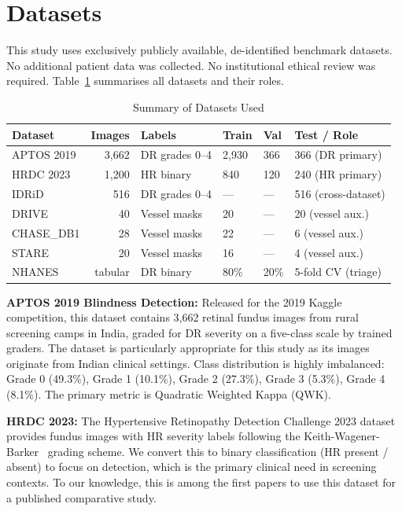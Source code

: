 \documentclass[review,12pt]{elsarticle}
\begin{document}
\section{Datasets}
\label{sec:datasets}

This study uses exclusively publicly available, de-identified benchmark
datasets. No additional patient data was collected. No institutional ethical
review was required. Table~\ref{tab:datasets} summarises all datasets and
their roles.

\begin{table}[htbp]
\caption{Summary of Datasets Used}
\label{tab:datasets}
\centering
\begin{tabular}{lrllll}
\toprule
\textbf{Dataset} & \textbf{Images} & \textbf{Labels} & \textbf{Train}
& \textbf{Val} & \textbf{Test / Role} \\
\midrule
APTOS 2019     & 3,662  & DR grades 0--4 & 2,930 & 366  & 366 (DR primary) \\
HRDC 2023      & 1,200  & HR binary      & 840   & 120  & 240 (HR primary) \\
IDRiD          & 516    & DR grades 0--4 & ---   & ---  & 516 (cross-dataset) \\
DRIVE          & 40     & Vessel masks   & 20    & ---  & 20  (vessel aux.) \\
CHASE\_DB1     & 28     & Vessel masks   & 22    & ---  & 6   (vessel aux.) \\
STARE          & 20     & Vessel masks   & 16    & ---  & 4   (vessel aux.) \\
NHANES         & tabular & DR binary     & 80\%  & 20\% & 5-fold CV (triage) \\
\bottomrule
\end{tabular}
\end{table}

\textbf{APTOS 2019 Blindness Detection:} Released for the 2019 Kaggle
competition, this dataset contains 3,662 retinal fundus images from rural
screening camps in India, graded for DR severity on a five-class scale by
trained graders. The dataset is particularly appropriate for this study as
its images originate from Indian clinical settings. Class distribution is
highly imbalanced: Grade 0 (49.3\%), Grade 1 (10.1\%), Grade 2 (27.3\%),
Grade 3 (5.3\%), Grade 4 (8.1\%). The primary metric is Quadratic Weighted
Kappa (QWK).

\textbf{HRDC 2023:} The Hypertensive Retinopathy Detection Challenge 2023
dataset provides fundus images with HR severity labels following the
Keith-Wagener-Barker~\cite{kwb1939} grading scheme. We convert this to binary
classification (HR present / absent) to focus on detection, which is the
primary clinical need in screening contexts. To our knowledge, this is among
the first papers to use this dataset for a published comparative study.
\end{document}
